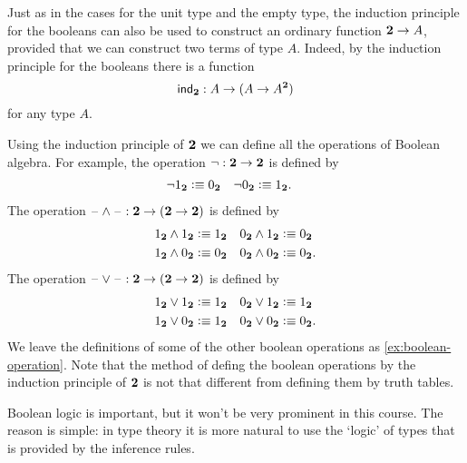Just as in the cases for the unit type and the empty type, the induction principle for the booleans can also be used to construct an ordinary function $\bool\to A$, provided that we can construct two terms of type $A$. Indeed, by the induction principle for the booleans there is a function
\begin{equation*}
  \indbool : A \to (A\to A^\bool)
\end{equation*}
for any type $A$.

\begin{eg}
  Using the induction principle of $\bool$ we can define all the operations of Boolean algebra. For example, the  operation $\neg : \bool \to \bool$ is defined by
  \begin{align*}
    \neg\btrue & \defeq \bfalse & \neg\bfalse & \defeq \btrue.
  \end{align*}
  The  operation $\blank\land\blank : \bool \to (\bool\to \bool)$ is defined by
  \begin{align*}
    \btrue\land\btrue & \defeq \btrue & \bfalse\land\btrue & \defeq \bfalse \\
    \btrue\land\bfalse & \defeq \bfalse & \bfalse\land\bfalse & \defeq \bfalse.
  \end{align*}
  The  operation $\blank\lor\blank : \bool \to (\bool\to \bool)$ is defined by
  \begin{align*}
    \btrue\lor\btrue & \defeq \btrue & \bfalse\lor\btrue & \defeq \btrue \\
    \btrue\lor\bfalse & \defeq \btrue & \bfalse\lor\bfalse & \defeq \bfalse.
  \end{align*}  
  We leave the definitions of some of the other boolean operations as \cref{ex:boolean-operation}. Note that the method of defing the boolean operations by the induction principle of $\bool$ is not that different from defining them by truth tables.

  Boolean logic is important, but it won't be very prominent in this course. The reason is simple: in type theory it is more natural to use the `logic' of types that is provided by the inference rules.
\end{eg}

